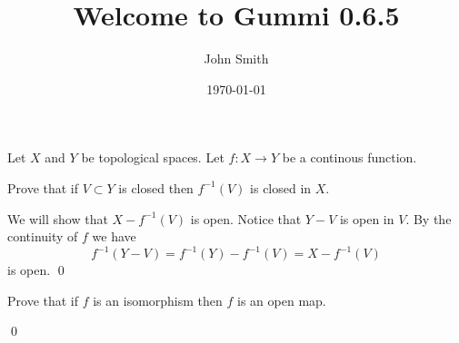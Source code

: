 \documentclass[11pt]{homework}
\title{\textbf{Welcome to Gummi 0.6.5}}
\author{John Smith}{1001234543}
\date{\today}
\begin{document}
\maketitle

\question
Let $X$ and $Y$ be topological spaces. Let $f:X \rightarrow Y$ be a continous function.

\qpart 
Prove that if $V \subset Y$ is closed then $f^{-1}(V)$ is closed in $X$.

\proof
We will show that $X - f^{-1}(V)$ is open. Notice that $Y -V$ is open in $V$. By the continuity of $f$ we have
$$
f^{-1}(Y - V) = f^{-1}(Y) - f^{-1}(V) = X - f^{-1}(V)
$$
is open. \qed 

\qpart
Prove that if $f$ is an isomorphism then $f$ is an open map.

\solution

\proof
\qed
\end{document}
